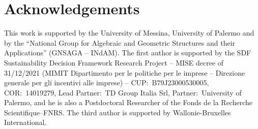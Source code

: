 \documentclass[reqno,a4paper]{amsart}
\theoremstyle{plain}
\theoremstyle{definition}
\theoremstyle{remark}
\numberwithin{equation}{section}
\begin{document}
\section*{Acknowledgements}
This work is supported by the University of Messina, University of Palermo and by the ``National Group for Algebraic and Geometric Structures and their Applications'' (GNSAGA -- INdAM). The first author is supported by the SDF Sustainability Decision Framework Research Project -- MISE decree of 31/12/2021 (MIMIT Dipartimento per le politiche per le imprese -- Direzione generale per gli incentivi alle imprese) -- CUP:~B79J23000530005, COR:~14019279, Lead Partner:~TD Group Italia Srl, Partner:~University of Palermo, and he is also a Postdoctoral Researcher of the Fonds de la Recherche Scientifique--FNRS. The third author is supported by Wallonie-Bruxelles International.






\end{document}
